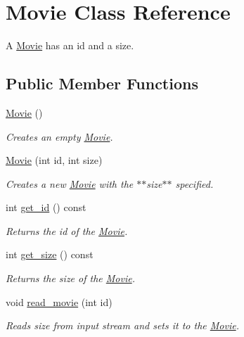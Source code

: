\hypertarget{class_movie}{
\section{Movie Class Reference}
\label{class_movie}
}


A \hyperlink{class_movie}{Movie} has an id and a size.  


\subsection*{Public Member Functions}
\begin{DoxyCompactItemize}
\item 
\hyperlink{class_movie_a62d82e9e61d6349ae66a73d0af6667ac}{Movie} ()
\begin{DoxyCompactList}\small\item\em Creates an empty \hyperlink{class_movie}{Movie}. \item\end{DoxyCompactList}\item 
\hyperlink{class_movie_a914e028c5499c5945f3acfb785977802}{Movie} (int id, int size)
\begin{DoxyCompactList}\small\item\em Creates a new \hyperlink{class_movie}{Movie} with the $\ast$$\ast$size$\ast$$\ast$ specified. \item\end{DoxyCompactList}\item 
int \hyperlink{class_movie_a363e66932a5d16dc86c58f57a8b3e72a}{get\_\-id} () const 
\begin{DoxyCompactList}\small\item\em Returns the id of the \hyperlink{class_movie}{Movie}. \item\end{DoxyCompactList}\item 
int \hyperlink{class_movie_a92d213d1f005f758cd298dff2a0355f8}{get\_\-size} () const 
\begin{DoxyCompactList}\small\item\em Returns the size of the \hyperlink{class_movie}{Movie}. \item\end{DoxyCompactList}\item 
void \hyperlink{class_movie_aed2f694a5ac3a776e3ba8d297dee6e3a}{read\_\-movie} (int id)
\begin{DoxyCompactList}\small\item\em Reads size from input stream and sets it to the \hyperlink{class_movie}{Movie}. \item\end{DoxyCompactList}\end{DoxyCompactItemize}


